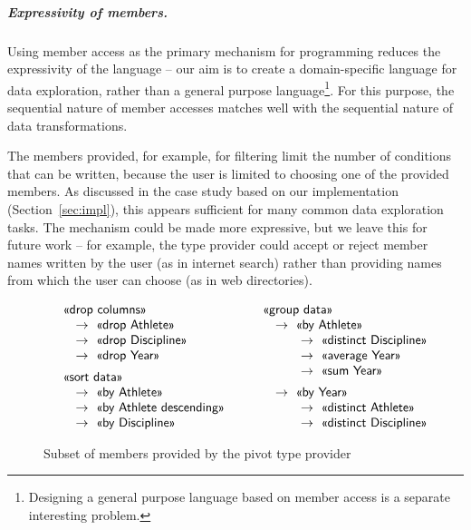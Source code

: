 \documentclass[a4paper,UKenglish]{lipics-v2016}
\theoremstyle{plain}
\theoremstyle{definition}
\newcommand{\qident}[1]{\textnormal{\sffamily \guillemotleft #1\guillemotright}}
\begin{document}
\subparagraph{Expressivity of members.} 
Using member access as the primary mechanism for programming reduces the expressivity of the 
language -- our aim is to create a domain-specific language for data exploration, rather than
a general purpose language\footnote{Designing a general purpose language based on member access
is a separate interesting problem.}. For this purpose, the sequential nature of member accesses 
matches well with the sequential nature of data transformations.

The members provided, for example, for filtering limit the number of conditions that can be 
written, because the user is limited to choosing one of the provided members.
As discussed in the case study based on our implementation (Section~\ref{sec:impl}),
this appears sufficient for many common data exploration tasks. The mechanism could be made
more expressive, but we leave this for future work -- for example, the type provider could
accept or reject member names written by the user (as in internet search) rather than providing 
names from which the user can choose (as in web directories).

 
\begin{figure}
\begin{equation*}
\quad \begin{array}{l}
\qident{drop columns}\\
\quad\rightarrow~\qident{drop Athlete}\\
\quad\rightarrow~\qident{drop Discipline}\\
\quad\rightarrow~\qident{drop Year}\\[0.5em]
\qident{sort data}\\
\quad\rightarrow~\qident{by Athlete}\\
\quad\rightarrow~\qident{by Athlete descending}\\
\quad\rightarrow~\qident{by Discipline}\\
\end{array}\qquad
\begin{array}{l}
\qident{group data}\\
\quad\rightarrow~\qident{by Athlete}\\
\qquad\quad\rightarrow~\qident{distinct Discipline}\\
\qquad\quad\rightarrow~\qident{average Year}\\
\qquad\quad\rightarrow~\qident{sum Year}\\[0.5em] 
\quad\rightarrow~\qident{by Year}\\
\qquad\quad\rightarrow~\qident{distinct Athlete}\\
\qquad\quad\rightarrow~\qident{distinct Discipline}\\
\end{array}
\end{equation*}
\caption{Subset of members provided by the pivot type provider}
\label{fig:pivot-members}
\end{figure}
\end{document}
